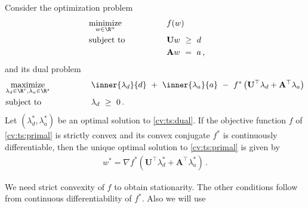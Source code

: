 
\begin{ftheorem}
  \label{cv:ts:th}
  Consider the optimization problem
\begin{align}
  \label{cv:ts:primal}
    &\underset{w \in \R^n}
    {\mathrm{minimize}}
    &&\qquad\qquad
    f(w)
    &&&
    \\
    \nonumber
    &\mathrm{subject}\ \mathrm{to} 
    &&\qquad\qquad
    \mathbf{U}w
    \ 
    \ge
    \ 
    d
    \\
    \nonumber
    &
    &&\qquad\qquad
    \mathbf{A}w
    \ 
    =
    \ 
    a
    \,,
\end{align}
and its dual problem
  \begin{alignat}{2}
    \label{cv:ts:dual}
    &\underset{
    \lambda_d \in \R^r
,
    \lambda_a \in \R^s
  }
    {\mathrm{maximize}}
    &&\qquad\qquad
    \inner
    {\lambda_d}
    {d}
    \ 
    +
    \ 
    \inner
    {\lambda_a}
    {a}
    \ 
    -
    \ 
    f^*
    \left( 
      \mathbf{U}^\top  \lambda_d
      +
      \mathbf{A}^\top  \lambda_a
    \right)
    \\
    \nonumber
    &\mathrm{subject}\ \mathrm{to} 
    &&\qquad\qquad
    \lambda_d
    \ 
    \ge
    \ 
    0
    \,.
\end{alignat}
  Let 
$
(\lambda_d^*,\lambda_a^*)
$
be an optimal solution to \eqref{cv:ts:dual}.
If the objective function $f$ of 
\eqref{cv:ts:primal} is strictly convex and its
convex conjugate $f^*$ is continuously differentiable,
then the unique optimal solution to 
\eqref{cv:ts:primal}
is given by
\begin{gather}
  w^*
  =
  \nabla
    f^*
    \left( 
      \mathbf{U}^\top  \lambda_d^*
      +
      \mathbf{A}^\top  \lambda_a^*
    \right)
    \,.
\end{gather}
\end{ftheorem}
We need strict convexity of $f$ to obtain stationarity. The other
conditions follow from 
continuous differentiability of $f^*$.
Also we will use
